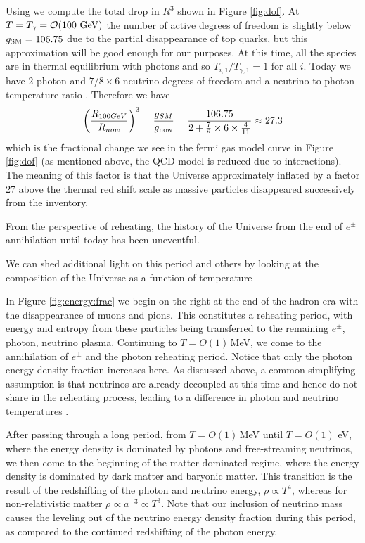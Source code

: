 Using  we compute the total drop in $R^3$ shown in Figure \ref{fig:dof}. At $T=T_\gamma=\mathcal{O}(100\text{ GeV})$ the number of active degrees of freedom is slightly below $g_{\rm SM}=106.75$ due to the partial disappearance of top quarks, but this approximation will be good enough for our purposes. At this time, all the species are in thermal equilibrium with photons and so $T_{i,1}/T_{\gamma,1}=1$ for all $i$. Today we have $2$ photon and $7/8\times 6$ neutrino degrees of freedom and a neutrino to photon temperature ratio . Therefore we have
\begin{equation}
\left(\frac{R_{100GeV}}{R_{now}}\right)^3= \frac{g_{SM}}{g_{\rm now}}=\frac{106.75}{2+\frac{7}{8}\times 6\times \frac{4}{11}}\approx 27.3
\end{equation}
which is the fractional change we see in the fermi gas model curve in Figure \ref{fig:dof} (as mentioned above, the QCD model is reduced due to interactions). The meaning of this factor is that the Universe approximately inflated by a factor 27 above the thermal red shift scale as massive particles disappeared successively from the inventory. 

From the perspective of reheating, the history of the Universe from the end of $e^\pm$ annihilation until today has been uneventful. 

We can shed additional light on this period and others by looking at the composition of the Universe as a function of temperature


In Figure \ref{fig:energy:frac} we begin on the right at the end of the hadron era with the disappearance of muons and pions. This constitutes a reheating period, with energy and entropy from these particles being transferred to the remaining $e^\pm$, photon, neutrino plasma. Continuing to $T=O(1)$\,MeV, we come to the annihilation of $e^\pm$ and the photon reheating period. Notice that only the photon energy density fraction increases here. As discussed above, a common simplifying assumption is that neutrinos are already decoupled at this time and hence do not share in the reheating process, leading to a difference in photon and neutrino temperatures .

After passing through a long period, from $T=O(1)$\,MeV until $T=O(1)$ eV, where the energy density is dominated by photons and free-streaming neutrinos, we then come to the beginning of the matter dominated regime, where the energy density is dominated by dark matter and baryonic matter. This transition is the result of the redshifting of the photon and neutrino energy, $\rho\propto T^4$, whereas for non-relativistic matter $\rho\propto a^{-3}\propto T^3$. Note that our inclusion of neutrino mass causes the leveling out of the neutrino energy density fraction during this period, as compared to the continued redshifting of the photon energy.

